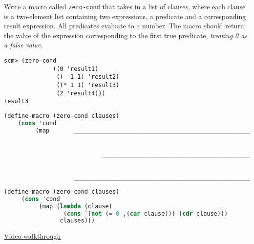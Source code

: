 \question Write a macro called \texttt{zero-cond} that takes in a list of clauses, where
each clause is a two-element list containing two expressions, a predicate and
a corresponding result expression. All predicates evaluate to a number. The
macro should return the value of the expression
corresponding to the first true predicate, \emph{treating 0 as a false value}.

\begin{lstlisting}
scm> (zero-cond
              ((0 'result1)
               ((- 1 1) 'result2)
               ((* 1 1) 'result3)
               (2 'result4)))
result3
\end{lstlisting}

\begin{lstlisting}[language=Scheme]
(define-macro (zero-cond clauses)
    (cons 'cond
         (map       ______________________________________________________________________


                            ________________________________________________________________________


                    ________________________________________________________________________)))
\end{lstlisting}

\begin{solution}
\begin{lstlisting}[language=Scheme]
(define-macro (zero-cond clauses)
     (cons 'cond
          (map (lambda (clause)
                 (cons `(not (= 0 ,(car clause))) (cdr clause)))
                clauses)))
\end{lstlisting}
\href{https://www.youtube.com/watch?v=ku_mRwurL_w}{Video walkthrough}
\end{solution}
